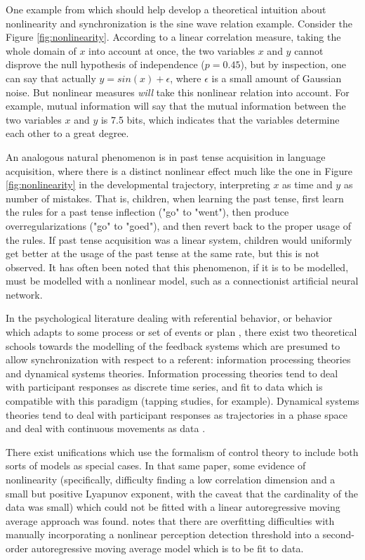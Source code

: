 \documentclass[12pt]{article}
\begin{document}
One example from \cite{anscombe} which should help develop a theoretical intuition about nonlinearity and synchronization is the sine wave relation example. Consider the Figure \ref{fig:nonlinearity}. According to a linear correlation measure, taking the whole domain of $x$ into account at once, the two variables $x$ and $y$ cannot disprove the null hypothesis of independence ($p=0.45$), but by inspection, one can say that actually $y = sin(x) + \epsilon$, where $\epsilon$ is a small amount of Gaussian noise. But nonlinear measures \emph{will} take this nonlinear relation into account. For example, mutual information will say that the mutual information between the two variables $x$ and $y$ is 7.5 bits, which indicates that the variables determine each other to a great degree.

An analogous natural phenomenon is in past tense acquisition in language acquisition, where there is a distinct nonlinear effect much like the one in Figure \ref{fig:nonlinearity} in the developmental trajectory\cite{childlang}, interpreting $x$ as time and $y$ as number of mistakes. That is, children, when learning the past tense, first learn the rules for a past tense inflection ("go" to "went"), then produce overregularizations ("go" to "goed"), and then revert back to the proper usage of the rules. If past tense acquisition was a linear system, children would uniformly get better at the usage of the past tense at the same rate, but this is not observed. It has often been noted that this phenomenon, if it is to be modelled, must be modelled with a nonlinear model, such as a connectionist artificial neural network\cite{childlang}.

In the psychological literature dealing with referential behavior, or behavior which adapts to some process or set of events or plan \cite{pressing}, there exist two theoretical schools towards the modelling of the feedback systems which are presumed to allow synchronization with respect to a referent: information processing theories and dynamical systems theories. Information processing theories tend to deal with participant responses as discrete time series, and fit to data which is compatible with this paradigm (tapping studies, for example). Dynamical systems theories tend to deal with participant responses as trajectories in a phase space and deal with continuous movements as data \cite{syncreview}.

There exist unifications \cite{pressing} which use the formalism of control theory to include both sorts of models as special cases. In that same paper, some evidence of nonlinearity (specifically, difficulty finding a low correlation dimension and a small but positive Lyapunov exponent, with the caveat that the cardinality of the data was small) which could not be fitted with a linear autoregressive moving average approach was found. \cite{schulze} notes that there are overfitting difficulties with manually incorporating a nonlinear perception detection threshold into a second-order autoregressive moving average model which is to be fit to data.
\end{document}

